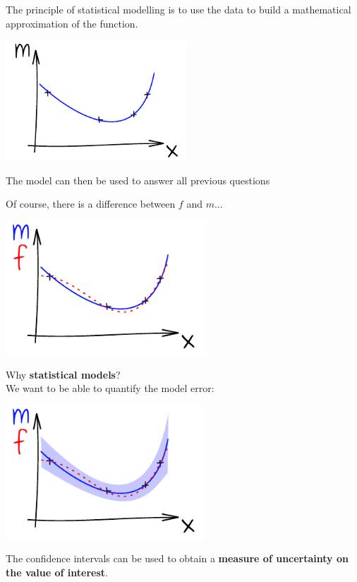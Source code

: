 \documentclass{beamer}
\begin{document}
\begin{frame}{}
The principle of statistical modelling is to use the data to build a mathematical approximation of the function. 
\begin{center}
\includegraphics[height=4.5cm]{figures/ink_m}
\end{center}
The model can then be used to answer all previous questions
\end{frame}

\begin{frame}{}
Of course, there is a difference between $f$ and $m$...
\begin{center}
\includegraphics[height=5cm]{figures/ink_mf}
\end{center}
\end{frame}

\begin{frame}{}
Why \textbf{statistical models}? \\We want to be able to quantify the model error:
\begin{center}
\includegraphics[height=5cm]{figures/ink_mconfint}
\end{center}
The confidence intervals can be used to obtain a \textbf{measure of uncertainty on the value of interest}.
\end{frame}
\end{document}
